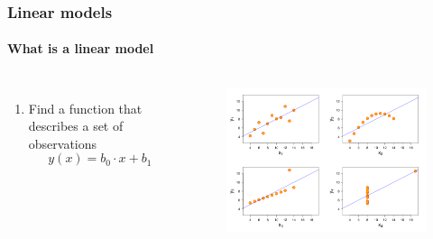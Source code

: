 \documentclass[aspectratio=43]{beamer}
\begin{document}
\begin{frame}

	\frametitle{Linear models}
	\framesubtitle{What is a linear model}

	\footnotesize
	
	\begin{columns}
		
		
		\begin{enumerate}
			\item Find a function that describes a set of observations
			\begin{equation}
			y(x) = b_{0} \cdot x + b_{1} \nonumber
			\end{equation}
		\end{enumerate}
		
		
		\begin{figure}[!htb]
			\includegraphics[width = \linewidth]{plots/part2/linear_model.png}
		\end{figure}
	
	\end{columns}

\end{frame}
\end{document}

